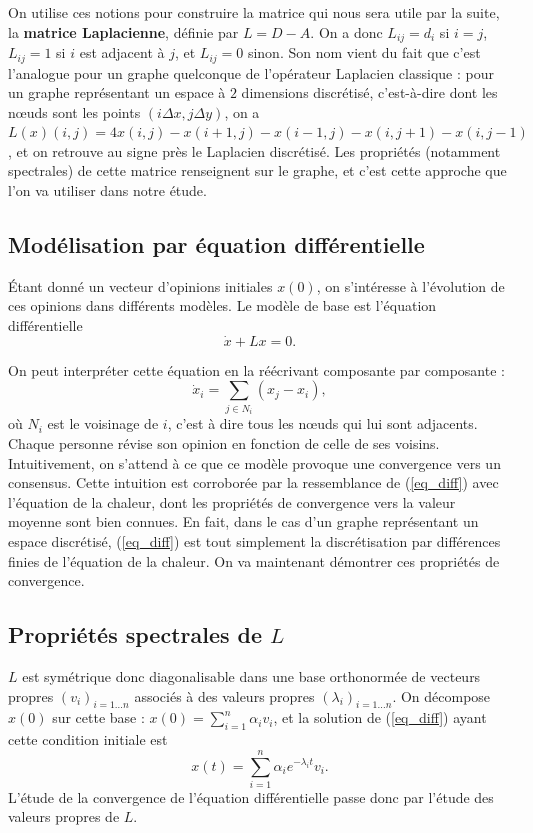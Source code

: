 \documentclass[12pt]{article}
\begin{document}
On utilise ces notions pour construire la matrice qui nous sera
utile par la suite, la {\bf matrice Laplacienne}, définie par $L
= D - A$. On a donc $L_{i j} = d_i$ si $i = j$, $L_{i j} = 1$ si
$i$ est adjacent à $j$, et $L_{i j} = 0$ sinon. Son nom vient du
fait que c'est l'analogue pour un graphe quelconque de
l'opérateur Laplacien classique : pour un graphe représentant un
espace à $2$ dimensions discrétisé, c'est-à-dire dont les n\oe uds
sont les points $(i \Delta x, j \Delta y)$, on a $L(x) (i, j) =
4 x(i, j) - x(i+1, j) - x(i-1, j) - x(i, j+1) - x(i, j-1)$, et
on retrouve au signe près le Laplacien discrétisé. Les
propriétés (notamment spectrales) de cette matrice renseignent
sur le graphe, et c'est cette approche que l'on va utiliser dans
notre étude.

\subsection{Modélisation par équation différentielle}
Étant donné un vecteur d'opinions initiales $x(0)$, on
s'intéresse à l'évolution de ces opinions dans différents
modèles. Le modèle de base est l'équation différentielle
\begin{equation}
 \label{eq_diff}
 \dot x + L x = 0.
\end{equation}

On peut interpréter cette équation en la réécrivant composante par composante :
\begin{equation}
 \label{eq_diff_scal}
 \dot {x}_i = \sum_{j \in N_i} (x_j - x_i),
\end{equation}
où $N_i$ est le voisinage de $i$, c'est à dire tous les n\oe uds qui lui
sont adjacents. Chaque personne révise son opinion en fonction de
celle de ses voisins. Intuitivement, on s'attend à ce que ce modèle
provoque une convergence vers un consensus. Cette intuition est
corroborée par la ressemblance de (\ref{eq_diff}) avec l'équation de
la chaleur, dont les propriétés de convergence vers la valeur moyenne
sont bien connues. En fait, dans le cas d'un graphe représentant un
espace discrétisé, (\ref{eq_diff}) est tout simplement la
discrétisation par différences finies de l'équation de la chaleur. On
va maintenant démontrer ces propriétés de convergence.

\subsection{Propriétés spectrales de $L$}
\label{props_spectrales_L}
$L$ est symétrique donc diagonalisable dans une base orthonormée de
vecteurs propres $(v_i)_{i=1\dots n}$ associés à des valeurs propres
$(\lambda_i)_{i=1 \dots n}$. On décompose $x(0)$ sur cette base : $x(0)
= \sum_{i=1}^n \alpha_i v_i$, et la solution de (\ref{eq_diff}) ayant
cette condition initiale est $$x(t) = \sum_{i=1}^n \alpha_i e^{-
 \lambda_i t} v_i.$$ L'étude de la convergence de l'équation
différentielle passe donc par l'étude des valeurs propres de $L$.
\end{document}
